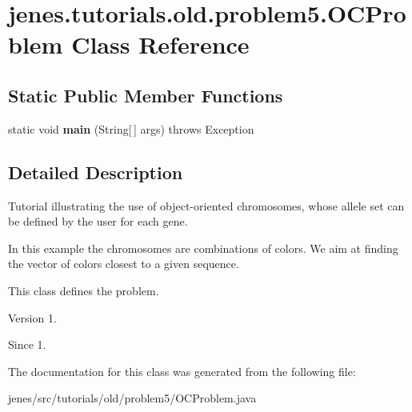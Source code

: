\hypertarget{classjenes_1_1tutorials_1_1old_1_1problem5_1_1_o_c_problem}{\section{jenes.\-tutorials.\-old.\-problem5.\-O\-C\-Problem Class Reference}
\label{classjenes_1_1tutorials_1_1old_1_1problem5_1_1_o_c_problem}
}
\subsection*{Static Public Member Functions}
\begin{DoxyCompactItemize}
\item 
\hypertarget{classjenes_1_1tutorials_1_1old_1_1problem5_1_1_o_c_problem_afb39fb22d5193f3dd2c7bcd0db99cee4}{static void {\bfseries main} (String\mbox{[}$\,$\mbox{]} args)  throws Exception }\label{classjenes_1_1tutorials_1_1old_1_1problem5_1_1_o_c_problem_afb39fb22d5193f3dd2c7bcd0db99cee4}

\end{DoxyCompactItemize}


\subsection{Detailed Description}
Tutorial illustrating the use of object-\/oriented chromosomes, whose allele set can be defined by the user for each gene.

In this example the chromosomes are combinations of colors. We aim at finding the vector of colors closest to a given sequence.

This class defines the problem.

\begin{DoxyVersion}{Version}
1. 
\end{DoxyVersion}
\begin{DoxySince}{Since}
1. 
\end{DoxySince}


The documentation for this class was generated from the following file\-:\begin{DoxyCompactItemize}
\item 
jenes/src/tutorials/old/problem5/O\-C\-Problem.\-java\end{DoxyCompactItemize}
